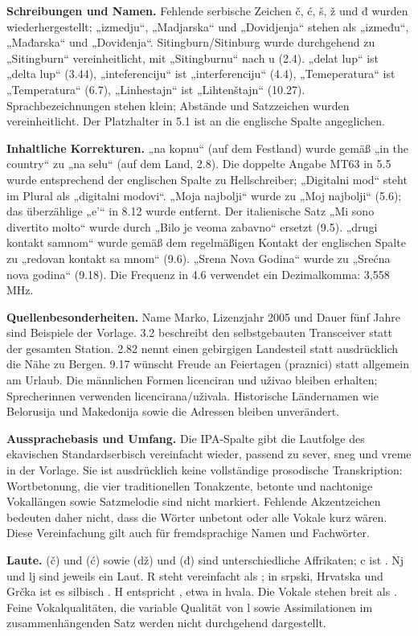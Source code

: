 \documentclass[a4paper,landscape,10pt]{article}
\newcommand{\ipa}[1]{{\ipafont[#1]}}
\begin{document}
\smallskip
\textbf{Schreibungen und Namen.} Fehlende serbische Zeichen č, ć, š, ž und đ wurden wiederhergestellt;
„izmedju“, „Madjarska“ und „Dovidjenja“ stehen als „između“, „Mađarska“ und „Doviđenja“.
Sitingburn/Sitinburg wurde durchgehend zu „Sitingburn“ vereinheitlicht, mit „Sitingburnu“ nach u (2.4).
„delat lup“ ist „delta lup“ (3.44), „inteferenciju“ ist „interferenciju“ (4.4),
„Temeperatura“ ist „Temperatura“ (6.7), „Linhestajn“ ist „Lihtenštajn“ (10.27).
Sprachbezeichnungen stehen klein; Abstände und Satzzeichen wurden vereinheitlicht.
Der Platzhalter in 5.1 ist an die englische Spalte angeglichen.

\smallskip
\textbf{Inhaltliche Korrekturen.} „na kopnu“ (auf dem Festland) wurde gemäß „in the country“
zu „na selu“ (auf dem Land, 2.8). Die doppelte Angabe MT63 in 5.5 wurde entsprechend der englischen Spalte
zu Hellschreiber; „Digitalni mod“ steht im Plural als „digitalni modovi“.
„Moja najbolji“ wurde zu „Moj najbolji“ (5.6); das überzählige „e’“ in 8.12 wurde entfernt.
Der italienische Satz „Mi sono divertito molto“ wurde durch „Bilo je veoma zabavno“ ersetzt (9.5).
„drugi kontakt samnom“ wurde gemäß dem regelmäßigen Kontakt der englischen Spalte zu
„redovan kontakt sa mnom“ (9.6). „Srena Nova Godina“ wurde zu „Srećna nova godina“ (9.18).
Die Frequenz in 4.6 verwendet ein Dezimalkomma: 3,558 MHz.

\smallskip
\textbf{Quellenbesonderheiten.} Name Marko, Lizenzjahr 2005 und Dauer fünf Jahre sind Beispiele der Vorlage.
3.2 beschreibt den selbstgebauten Transceiver statt der gesamten Station.
2.82 nennt einen gebirgigen Landesteil statt ausdrücklich die Nähe zu Bergen.
9.17 wünscht Freude an Feiertagen (praznici) statt allgemein am Urlaub.
Die männlichen Formen licenciran und uživao bleiben erhalten; Sprecherinnen verwenden licencirana/uživala.
Historische Ländernamen wie Belorusija und Makedonija sowie die Adressen bleiben unverändert.

\smallskip
\textbf{Aussprachebasis und Umfang.} Die IPA-Spalte gibt die Lautfolge des ekavischen Standardserbisch
vereinfacht wieder, passend zu sever, sneg und vreme in der Vorlage.
Sie ist ausdrücklich keine vollständige prosodische Transkription: Wortbetonung, die vier traditionellen
Tonakzente, betonte und nachtonige Vokallängen sowie Satzmelodie sind nicht markiert.
Fehlende Akzentzeichen bedeuten daher nicht, dass die Wörter unbetont oder alle Vokale kurz wären.
Diese Vereinfachung gilt auch für fremdsprachige Namen und Fachwörter.

\smallskip
\textbf{Laute.} \ipa{tʃ} (č) und \ipa{tɕ} (ć) sowie \ipa{dʒ} (dž) und \ipa{dʑ} (đ)
sind unterschiedliche Affrikaten; c ist \ipa{ts}. Nj \ipa{ɲ} und lj \ipa{ʎ} sind jeweils ein Laut.
R steht vereinfacht als \ipa{r}; in srpski, Hrvatska und Grčka ist es silbisch \ipa{r̩}.
H entspricht \ipa{x}, etwa in hvala. Die Vokale stehen breit als \ipa{a, e, i, o, u}.
Feine Vokalqualitäten, die variable Qualität von l sowie Assimilationen im zusammenhängenden Satz
werden nicht durchgehend dargestellt.
\end{document}

